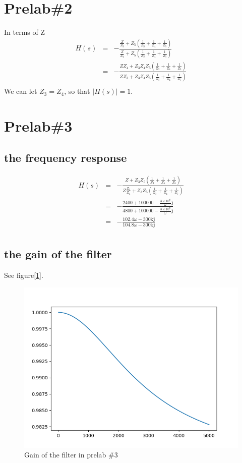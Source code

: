 \documentclass{IEEEtran}
\begin{document}
	\section{\textbf{Prelab\#2}}
	In terms of Z\\
	\begin{eqnarray*}
		H(s) & = & -\frac{\frac{Z}{Z_3}+Z_5(\frac{1}{Z_3}+\frac{1}{Z_4}+\frac{1}{Z_5})} {\frac{Z}{Z_4}+Z_5(\frac{1}{Z_3}+\frac{1}{Z_4}+\frac{1}{Z_5})}\\
		& = &-\frac{ZZ_4+Z_3Z_4Z_5(\frac{1}{Z_3}+\frac{1}{Z_4}+\frac{1}{Z_5})} {ZZ_3+Z_3Z_4Z_5(\frac{1}{Z_3}+\frac{1}{Z_4}+\frac{1}{Z_5})}\\	
	\end{eqnarray*}
	\phantom{ } We can let $ Z_3 = Z_4 $, so that $ |H(s)| = 1 $.
	\section{\textbf{Prelab\#3}}
	\subsection{the frequency response}
	\begin{eqnarray*}
		H(s) & = & -\frac{Z + Z_3Z_5(\frac{1}{Z_3}+\frac{1}{Z_4}+\frac{1}{Z_5})} {Z\frac{Z_3}{Z_4}+Z_3Z_5(\frac{1}{Z_3}+\frac{1}{Z_4}+\frac{1}{Z_5})}\\
		& = & - \frac{2400+100000-\frac{3\times10^8}{\omega}\mathbf{j}} {4800+100000-\frac{3\times10^8}{\omega}\mathbf{j}}\\
		& = & - \frac{102.4\omega - 300\mathrm{k}\mathbf{j}}{104.8\omega - 300\mathrm{k}\mathbf{j}}\\
	\end{eqnarray*}
	\subsection{the gain of the filter}
	See figure[\ref{fig:3.1}].
	
	\begin{figure}[!htbp]
		\centering
		\begin{framed}
			\includegraphics[width=\linewidth]{images/3_1.png}
			\caption{Gain of the filter in prelab \#3}
			\label{fig:3.1}
		\end{framed}
	\end{figure}
\end{document}
